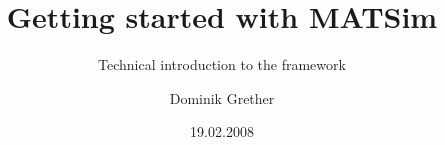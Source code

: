 
\title{Getting started with MATSim}

\subtitle{Technical introduction to the framework}


\author{Dominik Grether}


\date{19.02.2008}


\subject{Technical Introduction to MATSim}



